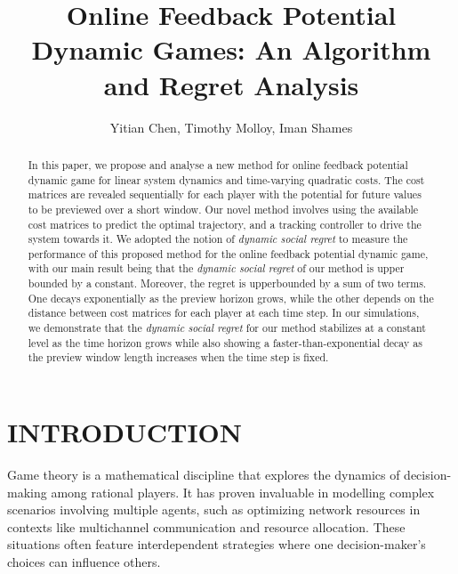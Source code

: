 \documentclass[letterpaper, 10 pt, conference]{ieeeconf}  %
\title{\LARGE \bf
Online Feedback Potential Dynamic Games: An Algorithm and Regret Analysis
}
\author{Yitian Chen, Timothy Molloy, Iman Shames%
}
\begin{document}
\maketitle
\thispagestyle{empty}
\pagestyle{empty}

\begin{abstract}
In this paper, we propose and analyse a new method for online feedback potential dynamic game for linear system dynamics and time-varying quadratic costs. The cost matrices are revealed sequentially for each player with the potential for future values to be previewed over a short window. Our novel method involves using the available cost matrices to predict the optimal trajectory, and a tracking controller to drive the system towards it. We adopted the notion of \emph{dynamic social regret} to measure the performance of this proposed method for the online feedback potential dynamic game, with our main result being that the \emph{dynamic social regret} of our method is upper bounded by a constant. Moreover, the regret is upperbounded by a sum of two terms. One decays exponentially as the preview horizon grows, while the other depends on the distance between cost matrices for each player at each time step. In our simulations, we demonstrate that the \emph{dynamic social regret} for our method stabilizes at a constant level as the time horizon grows while also showing a faster-than-exponential decay as the preview window length increases when the time step is fixed.
\end{abstract}


\section{INTRODUCTION}

Game theory is a mathematical discipline that explores the dynamics of decision-making among rational players. It has proven invaluable in modelling complex scenarios involving multiple agents, such as optimizing network resources in contexts like multichannel communication and resource allocation. These situations often feature interdependent strategies where one decision-maker's choices can influence others.
\end{document}

